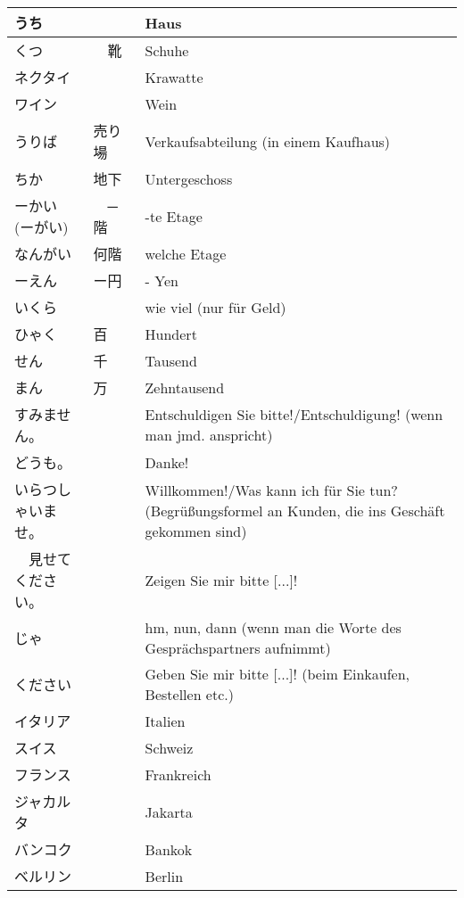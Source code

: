 \documentclass[a4paper,10pt]{article}
\begin{document}
\begin{CJK}{UTF8}{min}
\begin{center}
\begin{longtable}{|p{4cm}|p{2cm}|p{8cm}|}
  \hline  
  うち & & Haus \\
  \hline
  くつ &　靴　& Schuhe \\
  \hline
  ネクタイ &　& Krawatte\\
  \hline  
   ワイン & & Wein\\
  \hline
  うりば　& 売り場　	& Verkaufsabteilung (in einem Kaufhaus)\\
  \hline
  ちか & 地下　& Untergeschoss\\
  \hline  
  ーかい　(ーがい) &　─階 & -te Etage\\
  \hline
  なんがい & 何階	& welche Etage\\
  \hline
  ーえん	& ー円　& - Yen \\
  \hline  
   いくら & & wie viel (nur f\"ur Geld) \\
  \hline
  ひゃく	& 百　& Hundert \\
  \hline
  せん &	千　& Tausend \\
  \hline  
  まん　& 万 & Zehntausend \\
  \hline
  すみません。&	& Entschuldigen Sie bitte!/Entschuldigung! (wenn man jmd. anspricht) \\
  \hline
  どうも。　& & Danke! \\
  \hline  
  いらつしゃいませ。&  & Willkommen!/Was kann ich f\"ur Sie tun? (Begr\"ußungsformel an Kunden, die ins Gesch\"aft gekommen sind)\\
  \hline
  [...を]　見せてください。&	& Zeigen Sie mir bitte [...]!\\
  \hline
  じゃ　& & hm, nun, dann (wenn man die Worte des Gespr\"achspartners aufnimmt) \\
  \hline  
  [...を]ください &  & Geben Sie mir bitte [...]! (beim Einkaufen, Bestellen etc.)\\
  \hline
  イタリア &	& Italien\\
  \hline
  スイス　& & Schweiz\\
  \hline  
  フランス & & Frankreich\\
  \hline
  ジャカルタ & & Jakarta\\
  \hline
  バンコク　& & Bankok\\
  \hline  
  ベルリン & & Berlin\\
  \hline
\end{longtable}
\end{center}

\end{CJK}
\end{document}
